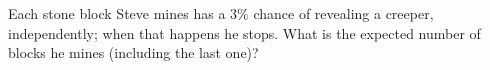 Each stone block Steve mines has a $3\%$ chance of revealing a creeper, independently; when that happens he stops. What is the expected number of blocks he mines (including the last one)?
